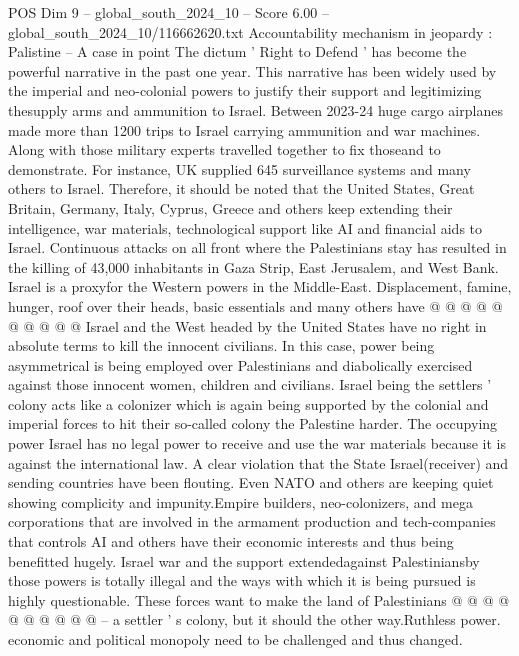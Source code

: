\begin{textsample}{POS Dim 9 – global\_south\_2024\_10 – Score 6.00 – global\_south\_2024\_10/116662620.txt}  \label{ex:f9_pos_082}
Accountability mechanism in jeopardy : Palistine -- A case in point The dictum ' Right to Defend ' has become the powerful narrative in the past one year.
This narrative has been widely used by the imperial and neo-colonial powers to justify their support and legitimizing thesupply arms and ammunition to Israel.
Between 2023-24 huge cargo airplanes made more than 1200 trips to Israel carrying ammunition and war machines.
Along with those military experts travelled together to fix thoseand to demonstrate.
For instance, UK supplied 645 surveillance systems and many others to Israel.
Therefore, it should be noted that the United States, Great Britain, Germany, Italy, Cyprus, Greece and others keep extending their intelligence, war materials, technological support like AI and financial aids to Israel.
Continuous attacks on all front where the Palestinians stay has resulted in the killing of 43,000 inhabitants in Gaza Strip, East Jerusalem, and West Bank.
Israel is a proxyfor the Western powers in the Middle-East.
Displacement, famine, hunger, roof over their heads, basic essentials and many others have @ @ @ @ @ @ @ @ @ @ Israel and the West headed by the United States have no right in absolute terms to kill the innocent civilians.
In this case, power being asymmetrical is being employed over Palestinians and diabolically exercised against those innocent women, children and civilians.
Israel being the settlers ' colony acts like a colonizer which is again being supported by the colonial and imperial forces to hit their so-called colony the Palestine harder.
The occupying power Israel has no legal power to receive and use the war materials because it is against the international law.
A clear violation that the State Israel(receiver) and sending countries have been flouting.
Even NATO and others are keeping quiet showing complicity and impunity.Empire builders, neo-colonizers, and mega corporations that are involved in the armament production and tech-companies that controls AI and others have their economic interests and thus being benefitted hugely.
Israel war and the support extendedagainst Palestiniansby those powers is totally illegal and the ways with which it is being pursued is highly questionable.
These forces want to make the land of Palestinians @ @ @ @ @ @ @ @ @ @ -- a settler ' s colony, but it should the other way.Ruthless power. economic and political monopoly need to be challenged and thus changed.

\end{textsample}
